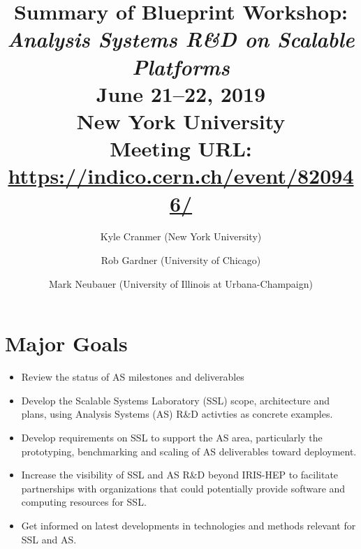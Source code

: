 \documentclass[11pt,letterpaper,fleqn]{article}
\date{} %
\title{\large Summary of Blueprint Workshop: \\
\vspace{1pt}
\color{red}
\LARGE \textit{Analysis Systems R\&D on Scalable Platforms} \\
\color{black} \normalsize
\vspace{10pt}
June 21--22, 2019 \\
New York University \\
Meeting URL: \href{https://indico.cern.ch/event/820946/}{https://indico.cern.ch/event/820946/}
} %
\author{Kyle Cranmer {\normalfont(New York University)}
      \and  Rob Gardner {\normalfont(University of Chicago)}
      \and  Mark Neubauer {\normalfont(University of Illinois at Urbana-Champaign)}
      }
\begin{document}
\maketitle %
\normalfont

\thispagestyle{firststyle}

\vspace{-45pt}

\section*{Major Goals}
\vspace{3pt}
\begin{itemize}
  \item Review the status of AS milestones and deliverables
  \item Develop the Scalable Systems Laboratory (SSL) scope, architecture and plans, using Analysis Systems (AS) R\&D activties as concrete examples.
  \item Develop requirements on SSL to support the AS area, particularly the prototyping, benchmarking and scaling of AS deliverables toward deployment.
  \item Increase the visibility of SSL and AS R\&D beyond IRIS-HEP to facilitate partnerships with organizations that could potentially provide software and computing resources for SSL.
  \item Get informed on latest developments in technologies and methods relevant for SSL and AS.
\end{itemize}
\end{document}
